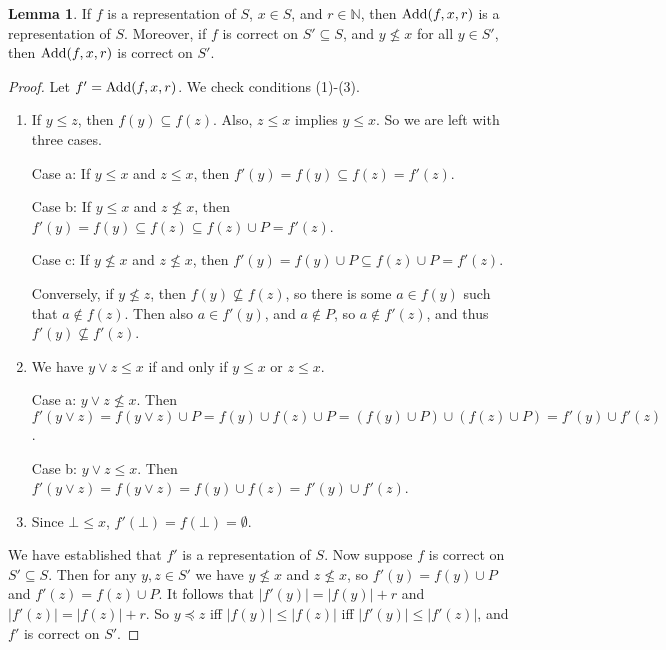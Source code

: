 \documentclass[12pt]{article}
\theoremstyle{definition}
\newtheorem{lemma}[theorem]{Lemma}
\begin{document}
\begin{lemma}\label{lem:add}
If $f$ is a representation of $S$, $x\in S$, and $r\in \mathbb{N}$, then $\text{Add}(f,x,r)$ is a representation of $S$. Moreover, if $f$ is correct on $S'\subseteq S$, and $y\not\leq x$ for all $y\in S'$, then $\text{Add}(f,x,r)$ is correct on $S'$. 
\end{lemma}
\begin{proof}
Let $f' = \text{Add}(f,x,r)$. We check conditions (1)-(3). 
\begin{enumerate}[(1)]
    \item If $y\leq z$, then $f(y) \subseteq f(z)$. Also, $z\leq x$ implies $y\leq x$. So we are left with three cases. 
    
    Case a: If $y\leq x$ and $z\leq x$, then $f'(y) = f(y)\subseteq f(z) = f'(z)$. 
    
    Case b: If $y\leq x$ and $z\not\leq x$, then $f'(y) = f(y) \subseteq f(z) \subseteq f(z)\cup P = f'(z)$. 
    
    Case c: If $y\not\leq x$ and $z\not\leq x$, then $f'(y) = f(y)\cup P \subseteq f(z)\cup P = f'(z)$. 
    
    Conversely, if $y\not\leq z$, then $f(y)\not\subseteq f(z)$, so there is some $a\in f(y)$ such that $a\notin f(z)$. Then also $a\in f'(y)$, and $a\notin P$, so $a\notin f'(z)$, and thus $f'(y)\not\subseteq f'(z)$. 
    \item We have $y\vee z \leq x$ if and only if $y\leq x$ or $z\leq x$. 
    
    Case a: $y\vee z \not\leq x$. Then $f'(y\vee z) = f(y\vee z)\cup P = f(y)\cup f(z)\cup P = (f(y)\cup P)\cup (f(z)\cup P) = f'(y)\cup f'(z)$. 
    
    Case b: $y\vee z\leq x$. Then $f'(y\vee z) = f(y\vee z) = f(y)\cup f(z) = f'(y)\cup f'(z)$. 
    
    \item Since $\bot\leq x$, $f'(\bot) = f(\bot) = \emptyset$.
\end{enumerate}

We have established that $f'$ is a representation of $S$. Now suppose $f$ is correct on $S'\subseteq S$. Then for any $y,z\in S'$ we have $y\not\leq x$ and $z\not\leq x$, so $f'(y) = f(y)\cup P$ and $f'(z) = f(z)\cup P$. It follows that $|f'(y)| = |f(y)|+r$ and $|f'(z)| = |f(z)|+r$. So $y\preceq z$ iff $|f(y)|\leq |f(z)|$ iff $|f'(y)|\leq |f'(z)|$, and $f'$ is correct on $S'$. 
\end{proof}


\end{document}
